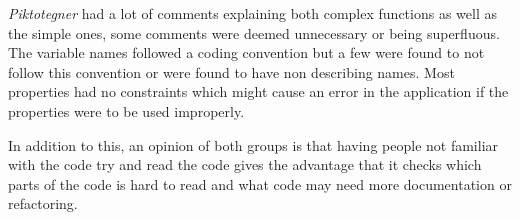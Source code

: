 \textit{Piktotegner} had a lot of comments explaining both complex functions as well as the simple ones, some comments were deemed unnecessary or being superfluous.
The variable names followed a coding convention but a few were found to not follow this convention or were found to have non describing names.
Most properties had no constraints which might cause an error in the application if the properties were to be used improperly.
% 

In addition to this, an opinion of both groups is that having people not familiar with the code try and read the code gives the advantage that it checks which parts of the code is hard to read and what code may need more documentation or refactoring.

